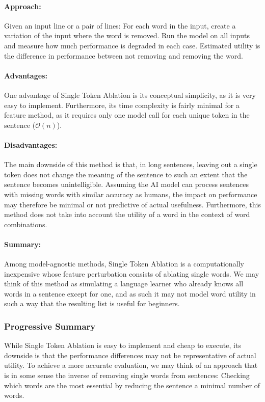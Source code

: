 \paragraph{Approach:}
Given an input line or a pair of lines:
For each word in the input, create a variation of the input where the word is removed.
Run the model on all inputs and measure how much performance is degraded in each case.
Estimated utility is the difference in performance between not removing and removing the word.

\paragraph{Advantages:}
One advantage of Single Token Ablation is its conceptual simplicity, as it is very easy to implement.
Furthermore, its time complexity is fairly minimal for a feature method, as it requires only one model call for each unique token in the sentence ($\mathcal{O}(n)$).

\paragraph{Disadvantages:}
The main downside of this method is that, in long sentences, leaving out a single token does not change the meaning of the sentence to such an extent that the sentence becomes unintelligible.
Assuming the AI model can process sentences with missing words with similar accuracy as humans, the impact on performance may therefore be minimal or not predictive of actual usefulness.
Furthermore, this method does not take into account the utility of a word in the context of word combinations.

\paragraph{Summary:}
Among model-agnostic methods, Single Token Ablation is a computationally inexpensive whose feature perturbation consists of ablating single words.
We may think of this method as simulating a language learner who already knows all words in a sentence except for one, and as such it may not model word utility in such a way that the resulting list is useful for beginners.

\subsubsection{Progressive Summary}
While Single Token Ablation is easy to implement and cheap to execute, its downside is that the performance differences may not be representative of actual utility.
To achieve a more accurate evaluation, we may think of an approach that is in some sense the inverse of removing single words from sentences:
Checking which words are the most essential by reducing the sentence a minimal number of words.

